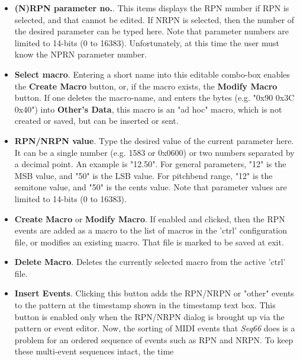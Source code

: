 \begin{itemize}
         Clicking on this button toggles between showing the parameter numbers
         and parameter values in hexadecimal versus decimal format.
      \item \textbf{(N)RPN parameter no.}.
         This items displays the RPN number if RPN is selected, and that
         cannot be edited.
         If NRPN is selected, then the number of the desired
         parameter can be typed here.
         Note that parameter numbers are limited to 14-bits (0 to 16383).
         Unfortunately, at this time the user must know the NPRN parameter
         number.
      \item \textbf{Select macro}.
         Entering a short name into this editable combo-box enables the
         \textbf{Create Macro} button, or, if the macro exists,
         the \textbf{Modify Macro} button.
         If one deletes the macro-name, and enters the bytes (e.g.
         "0x90 0x3C 0x40") into \textbf{Other's Data}, this macro
         is an "ad hoc" macro, which is not created or saved, but
         can be inserted or sent.
      \item \textbf{RPN/NRPN value}.
         Type the desired value of the current parameter here.
         It can be a single number (e.g. 1583 or 0x0600)
         or two numbers separated by a decimal point.
         An example is "12.50".
         For general parameters, "12" is the MSB value,
         and "50" is the LSB value.
         For pitchbend range, "12" is the semitone value, and
         "50" is the cents value.
         Note that parameter values are limited to 14-bits (0 to 16383).
      \item \textbf{Create Macro} or \textbf{Modify Macro}.
         If enabled and clicked, then the RPN events are added as a macro
         to the list of macros in the 'ctrl' configuration file,
         or modifies an existing macro.
         That file is marked to be saved at exit.
      \item \textbf{Delete Macro}.
         Deletes the currently selected macro from the active 'ctrl'
         file.
      \item \textbf{Insert Events}.
         Clicking this button adds the RPN/NRPN or "other" events to the
         pattern at the timestamp shown in the timestamp text box.
         This button is enabled only when the RPN/NRPN dialog is
         brought up via the pattern or event editor.
         Now, the sorting of MIDI events that \textsl{Seq66} does is
         a problem for an ordered sequence of events such as RPN and NRPN.
         To keep these multi-event sequences intact, the time

\end{itemize}
